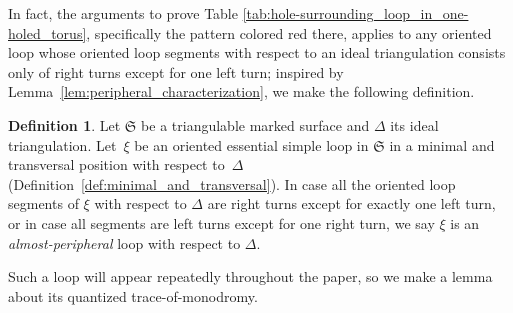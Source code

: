 \documentclass[pdftex]{sigma}
\numberwithin{equation}{section}
\theoremstyle{definition}
\newtheorem{Definition}[Theorem]{Definition}
\begin{document}
In fact, the arguments to prove Table \ref{tab:hole-surrounding_loop_in_one-holed_torus}, specifically the pattern colored red there, applies to any oriented loop whose oriented loop segments with respect to an ideal triangulation consists only of right turns except for one left turn; inspired by Lemma~\ref{lem:peripheral_characterization}, we make the following definition.
\begin{Definition}
\label{def:AP}
Let $\mathfrak{S}$ be a triangulable marked surface and $\Delta$ its ideal triangulation. Let~$\xi$ be an oriented essential simple loop in $\mathfrak{S}$ in a minimal and transversal position with respect to~$\Delta$ (Definition~\ref{def:minimal_and_transversal}).
In case all the oriented loop segments of $\xi$ with respect to $\Delta$ are right turns except for exactly one left turn, or in case all segments are left turns except for one right turn, we say $\xi$ is an {\em almost-peripheral} loop with respect to $\Delta$.
\end{Definition}
Such a loop will appear repeatedly throughout the paper, so we make a lemma about its quantized trace-of-monodromy.
\end{document}
